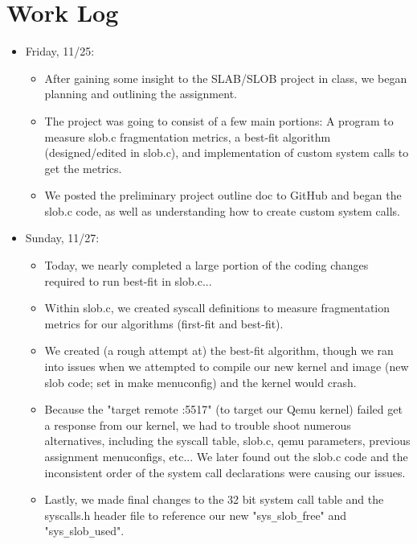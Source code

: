 \documentclass[letterpaper,10pt,onecolumn]{IEEEtran}
\begin{document}
    
    \section*{Work Log}
    
    
    \begin{itemize}
        \item Friday, 11/25:
            \begin{itemize} 
                \item After gaining some insight to the SLAB/SLOB project in class, we began planning and outlining the assignment.
                \item The project was going to consist of a few main portions: A program to measure slob.c fragmentation metrics, a best-fit algorithm (designed/edited in slob.c), and implementation of custom system calls to get the metrics.
                \item We posted the preliminary project outline doc to GitHub and began the slob.c code, as well as understanding how to create custom system calls.
        	\end{itemize}
        \item Sunday, 11/27:
            \begin{itemize} 
                \item Today, we nearly completed a large portion of the coding changes required to run best-fit in slob.c... 
                \item Within slob.c, we created syscall definitions to measure fragmentation metrics for our algorithms (first-fit and best-fit).
                \item We created (a rough attempt at) the best-fit algorithm, though we ran into issues when we attempted to compile our new kernel and image (new slob code; set in make menuconfig) and the kernel would crash.
                \item Because the "target remote :5517" (to target our Qemu kernel) failed get a response from our kernel, we had to trouble shoot numerous alternatives, including the syscall table, slob.c, qemu parameters, previous assignment menuconfigs, etc... We later found out the slob.c code and the inconsistent order of the system call declarations were causing our issues. 
                \item Lastly, we made final changes to the 32 bit system call table and the syscalls.h header file to reference our new "sys\texttt{\_}slob\texttt{\_}free" and "sys\texttt{\_}slob\texttt{\_}used".
        	\end{itemize}

\end{itemize}
\end{document}
